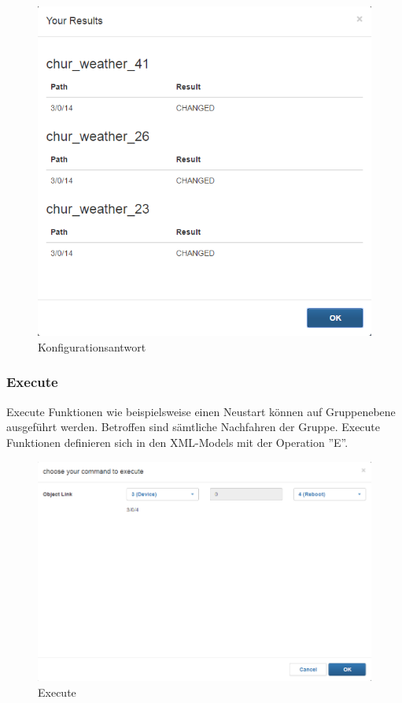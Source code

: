 \begin{figure}[H]
\centering
\includegraphics[scale=0.6]{../04_Realisierung/images/userinterface/configresults.png}
\caption{Konfigurationsantwort}
\end{figure}

\subsubsection{Execute}
Execute Funktionen wie beispielsweise einen Neustart können auf Gruppenebene ausgeführt werden. Betroffen sind sämtliche Nachfahren der Gruppe. Execute Funktionen definieren sich in den XML-Models mit der Operation ''E''.

\begin{figure}[H]
\centering
\includegraphics[scale=0.6]{../04_Realisierung/images/userinterface/execute.png}
\caption{Execute}
\end{figure}

